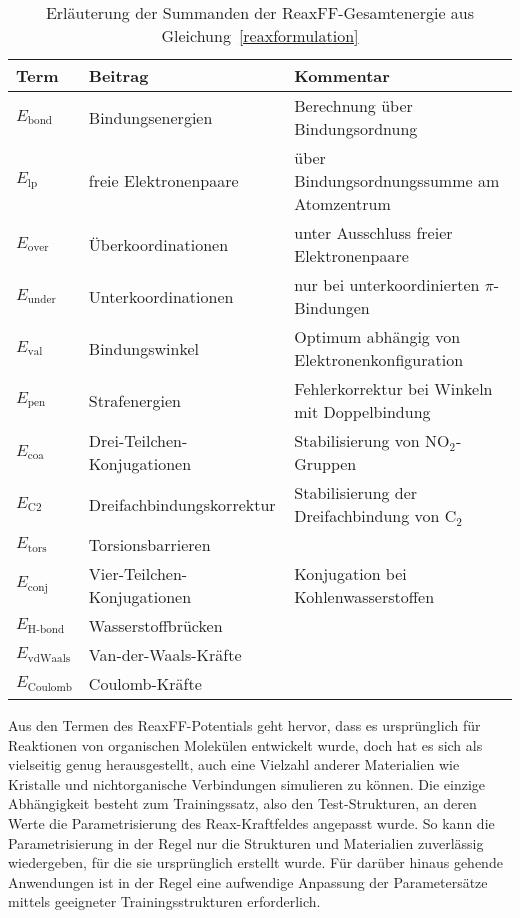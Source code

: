 \begin{table}
  \oddrowcolors
  \caption[Summanden der ReaxFF-Gesamtenergie]{
    Erläuterung der Summanden der ReaxFF-Gesamtenergie aus Gleichung~\ref{reaxformulation}\cite{van_duin_reaxff:_2001}
  }
  \label{tab:reaxenergies}
  \begin{tabularx}{\textwidth}{|llX|}
    \hline
    \textbf{Term}      & \textbf{Beitrag}            & \textbf{Kommentar}                            \\
    \hline
    $E_\text{bond}$    & Bindungsenergien            & Berechnung über Bindungsordnung               \\
    $E_\text{lp}$      & freie Elektronenpaare       & über Bindungsordnungssumme am Atomzentrum     \\
    $E_\text{over}$    & Überkoordinationen          & unter Ausschluss freier Elektronenpaare       \\
    $E_\text{under}$   & Unterkoordinationen         & nur bei unterkoordinierten $\pi$-Bindungen    \\
    $E_\text{val}$     & Bindungswinkel              & Optimum abhängig von Elektronenkonfiguration  \\
    $E_\text{pen}$     & Strafenergien               & Fehlerkorrektur bei Winkeln mit Doppelbindung \\
    $E_\text{coa}$     & Drei-Teilchen-Konjugationen & Stabilisierung von NO$_2$-Gruppen             \\
    $E_\text{C2}$      & Dreifachbindungskorrektur   & Stabilisierung der Dreifachbindung von C$_2$  \\
    $E_\text{tors}$    & Torsionsbarrieren           &                                               \\
    $E_\text{conj}$    & Vier-Teilchen-Konjugationen & Konjugation bei Kohlenwasserstoffen           \\
    $E_\text{H-bond}$  & Wasserstoffbrücken          &                                               \\
    $E_\text{vdWaals}$ & Van-der-Waals-Kräfte        &                                               \\
    $E_\text{Coulomb}$ & Coulomb-Kräfte              &                                               \\
    \hline
  \end{tabularx}
\end{table}

Aus den Termen des ReaxFF-Potentials geht hervor, dass es ursprünglich für Reaktionen von organischen Molekülen entwickelt wurde, doch hat es sich als vielseitig genug herausgestellt, auch eine Vielzahl anderer Materialien wie Kristalle und nichtorganische Verbindungen simulieren zu können.
Die einzige Abhängigkeit besteht zum Trainingssatz, also den Test-Strukturen, an deren Werte die Parametrisierung des Reax-Kraftfeldes angepasst wurde.
So kann die Parametrisierung in der Regel nur die Strukturen und Materialien zuverlässig wiedergeben, für die sie ursprünglich erstellt wurde.
Für darüber hinaus gehende Anwendungen ist in der Regel eine aufwendige Anpassung der Parametersätze mittels geeigneter Trainingsstrukturen erforderlich.

